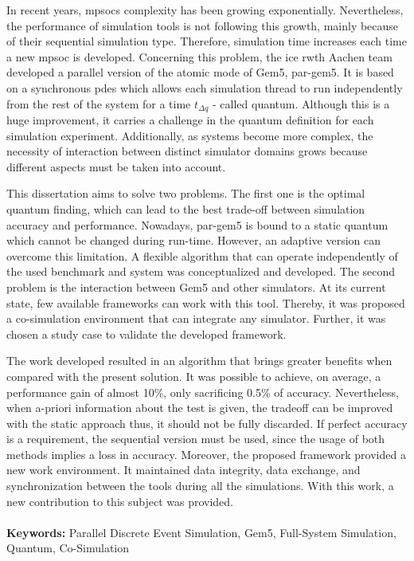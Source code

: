 





\vspace*{-0.5cm}

In recent years, \glspl{mpsoc} complexity has been growing exponentially. Nevertheless, the performance of simulation tools is not 
following this growth, mainly because of their sequential simulation type. Therefore, simulation time increases each time a new \gls{mpsoc} 
is developed. Concerning this problem, the \gls{ice} \gls{rwth} Aachen team developed a parallel version of the atomic mode of Gem5, par-gem5. 
It is based on a synchronous \gls{pdes} which allows each simulation thread to run independently from the rest of the system for a time 
$t_{\Delta q}$ - called quantum. Although this is a huge improvement, it carries a challenge in the quantum definition for each simulation experiment. 
Additionally, as systems become more complex, the necessity of interaction between distinct simulator domains grows because different aspects 
must be taken into account. 

This dissertation aims to solve two problems. The first one is the optimal quantum finding, which can lead to the best trade-off between 
simulation accuracy and performance. Nowadays, par-gem5 is bound to a static quantum which cannot be changed during run-time. However, an adaptive 
version can overcome this limitation. A flexible algorithm that can operate independently of the used benchmark and system was conceptualized and 
developed. The second problem is the interaction between Gem5 and other simulators. At its current state, few available 
frameworks can work with this tool. Thereby, it was proposed a co-simulation environment that can integrate any 
simulator. Further, it was chosen a study case to validate the developed framework.

The work developed resulted in an algorithm that brings greater benefits when compared with the present solution. It was possible to achieve, 
on average, a performance gain of almost 10\%, only sacrificing 0.5\% of accuracy. Nevertheless, when a-priori information about the 
test is given, the tradeoff can be improved with the static approach thus, it should not be fully discarded. 
If perfect accuracy is a requirement, the sequential version must be used, since the usage of both methods implies a loss in accuracy. 
Moreover, the proposed framework provided a new work environment. It maintained data integrity, data exchange, and synchronization 
between the tools during all the simulations. With this work, a new contribution to this subject was provided.

\paragraph{}\textbf{Keywords:} Parallel Discrete Event Simulation, Gem5, Full-System Simulation, Quantum, Co-Simulation
